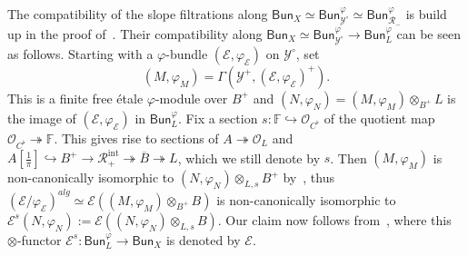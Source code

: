\documentclass[11pt]{article}
\theoremstyle{definition}
\numberwithin{equation}{section}
\numberwithin{figure}{section}
\numberwithin{table}{section}
\newcommand{\Bun}{\mathsf{Bun}}
\begin{document}
The compatibility of the slope filtrations along $\Bun_{X}\simeq\Bun_{\mathscr{Y}^{\circ}}^{\varphi}\simeq\Bun_{\mathscr{R}_{-}}^{\varphi}$ is build up in the proof of~\cite[11.2.22]{FaFo15}. Their compatibility along $\Bun_{X}\simeq\Bun_{\mathscr{Y}^{\circ}}^{\varphi}\rightarrow\Bun_{L}^{\varphi}$ can be seen as follows. Starting with a $\varphi$-bundle $(\mathscr{E},\varphi_{\mathscr{E}})$ on $\mathscr{Y}^{\circ}$, set
\[
(M,\varphi_{M})=\Gamma\left(\mathscr{Y}^{+},(\mathscr{E},\varphi_{\mathscr{E}})^{+}\right).
\]
This is a finite free \'etale $\varphi$-module over $B^{+}$ and $(N,\varphi_{N})=(M,\varphi_{M})\otimes_{B^{+}}L$ is the image of $(\mathscr{E},\varphi_{\mathscr{E}})$ in $\Bun_{L}^{\varphi}$. Fix a section $s:\mathbb{F}\hookrightarrow\mathcal{O}_{C^{\flat}}$ of the quotient map $\mathcal{O}_{C^{\flat}}\twoheadrightarrow\mathbb{F}$. This gives rise to sections of $A\twoheadrightarrow\mathcal{O}_{L}$ and $A[\frac{1}{\pi}]\hookrightarrow B^{+}\rightarrow\mathscr{R}_{+}^{\mathrm{int}}\twoheadrightarrow\overline{B}\twoheadrightarrow L$, which we still denote by $s$. Then $(M,\varphi_{M})$ is non-canonically isomorphic to $(N,\varphi_{N})\otimes_{L,s}B^{+}$ by~\cite[\S 11.1]{FaFo15}, thus $(\mathscr{E}/\varphi_{\mathscr{E}})^{alg}\simeq\mathcal{E}((M,\varphi_{M})\otimes_{B^{+}}B)$ is non-canonically isomorphic to $\mathcal{E}^{s}(N,\varphi_{N}):=\mathcal{E}((N,\varphi_{N})\otimes_{L,s}B)$. Our claim now follows from~\cite[\S 8.2.4]{FaFo15}, where this $\otimes$-functor $\mathcal{E}^{s}:\Bun_{L}^{\varphi}\rightarrow\Bun_{X}$ is denoted by $\mathcal{E}$.
\end{document}
